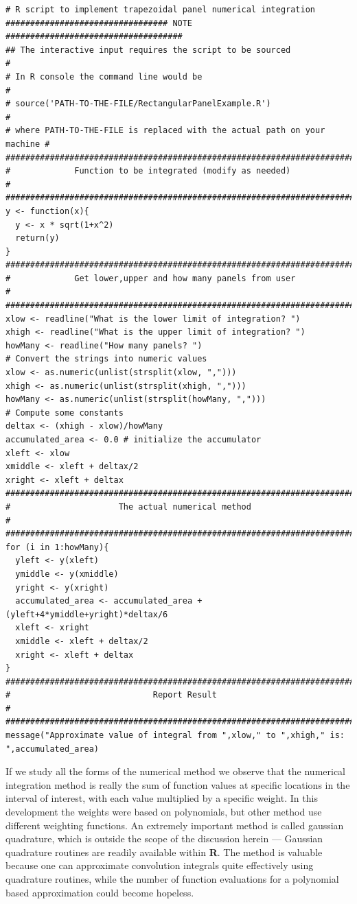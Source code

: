 \begin{lstlisting}[caption=R code demonstrating Parabolic Panel Numerical Integration, label=lst:ParaPanels]
# R script to implement trapezoidal panel numerical integration
################################# NOTE ####################################
## The interactive input requires the script to be sourced                #
# In R console the command line would be                                  #
# source('PATH-TO-THE-FILE/RectangularPanelExample.R')                    #
# where PATH-TO-THE-FILE is replaced with the actual path on your machine #
###########################################################################
#             Function to be integrated (modify as needed)                #
###########################################################################
y <- function(x){
  y <- x * sqrt(1+x^2)
  return(y)
}
###########################################################################
#             Get lower,upper and how many panels from user               #
###########################################################################
xlow <- readline("What is the lower limit of integration? ")  
xhigh <- readline("What is the upper limit of integration? ")
howMany <- readline("How many panels? ")
# Convert the strings into numeric values
xlow <- as.numeric(unlist(strsplit(xlow, ",")))
xhigh <- as.numeric(unlist(strsplit(xhigh, ",")))
howMany <- as.numeric(unlist(strsplit(howMany, ",")))
# Compute some constants
deltax <- (xhigh - xlow)/howMany  
accumulated_area <- 0.0 # initialize the accumulator
xleft <- xlow
xmiddle <- xleft + deltax/2
xright <- xleft + deltax
##########################################################################
#                      The actual numerical method                       #
##########################################################################
for (i in 1:howMany){
  yleft <- y(xleft)
  ymiddle <- y(xmiddle)
  yright <- y(xright)
  accumulated_area <- accumulated_area + (yleft+4*ymiddle+yright)*deltax/6
  xleft <- xright
  xmiddle <- xleft + deltax/2
  xright <- xleft + deltax
}
##########################################################################
#                             Report Result                              #
##########################################################################
message("Approximate value of integral from ",xlow," to ",xhigh," is: ",accumulated_area)
\end{lstlisting}

If we study all the forms of the numerical method we observe that the numerical integration method is really the sum of function values at specific locations in the interval of interest, with each value multiplied by a specific weight. 
In this development the weights were based on polynomials, but other method use different weighting functions.  
An extremely important method is called gaussian quadrature, which is outside the scope of the discussion herein  --- Gaussian quadrature routines are readily available within \textbf{R}.
The method is valuable because one can approximate convolution integrals quite effectively using quadrature routines, while the number of function evaluations for a polynomial based approximation could become hopeless.

